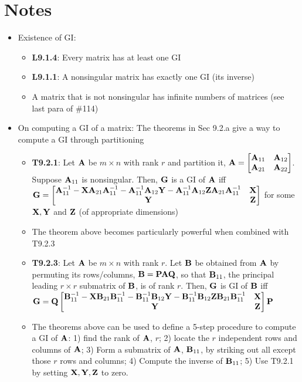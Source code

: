 \documentclass[a4paper, oneside]{book}
\begin{document}
\section*{Notes}
\begin{itemize}
\item Existence of GI:
	\begin{itemize}
	\item \textbf{L9.1.4}: Every matrix has at least one GI
	\item \textbf{L9.1.1}: A nonsingular matrix has exactly one GI (\ie its inverse)
	\item A matrix that is not nonsingular has infinite numbers of matrices (see last para of \#114)
	\end{itemize}
\item On computing a GI of a matrix: The theorems in Sec 9.2.a give a way to compute a GI through partitioning
\begin{itemize}
	\item \textbf{T9.2.1}: Let $\mathbf A$ be $m\times n$ with rank $r$ and partition it, $\mathbf A=\begin{bmatrix} \mathbf A_{11} & \mathbf A_{12} \\ \mathbf A_{21} & \mathbf A_{22} \end{bmatrix}$. Suppose $\mathbf A_{11}$ is nonsingular. Then, $\mathbf G$ is a GI of $\mathbf A$ iff 
	$\mathbf{G}=\begin{bmatrix}
	\mathbf A^{-1}_{11}-\mathbf{X}\mathbf A_{21} \mathbf A^{-1}_{11}-\mathbf A^{-1}_{11} \mathbf A_{12} \mathbf Y - \mathbf A^{-1}_{11} \mathbf A_{12} \mathbf{ZA}_{21}\mathbf A^{-1}_{11} & \mathbf X \\
	\mathbf Y & \mathbf Z
	\end{bmatrix}$ for some $\mathbf{X, Y}$ and $\mathbf Z$ (of appropriate dimensions)
	\item The theorem above becomes particularly powerful when combined with T9.2.3
	\item \textbf{T9.2.3}: Let $\mathbf A$ be $m\times n$ with rank $r$. Let $\mathbf B$ be obtained from $\mathbf A$ by permuting its rows/columns, \ie $\mathbf{B=PAQ}$, so that $\mathbf{B}_{11}$, the principal leading $r\times r$ submatrix of $\mathbf{B}$, is of rank $r$. Then, $\mathbf G$ is GI of $\mathbf B$ iff 
	$\mathbf{G}=\mathbf Q \begin{bmatrix}
	\mathbf B^{-1}_{11}-\mathbf{X}\mathbf B_{21} \mathbf B^{-1}_{11}-\mathbf B^{-1}_{11} \mathbf B_{12} \mathbf Y - \mathbf B^{-1}_{11} \mathbf B_{12} \mathbf{ZB}_{21}\mathbf B^{-1}_{11} & \mathbf X \\
	\mathbf Y & \mathbf Z
	\end{bmatrix}\mathbf P$
	\item The theorems above can be used to define a 5-step procedure to compute a GI of $\mathbf A$: 1) find the rank of $\mathbf A$, $r$; 2) locate the $r$ independent rows and columns of $\mathbf A$; 3) Form a submatrix of $\mathbf A$, $\mathbf B_{11}$, by striking out all except those $r$ rows and columns; 4) Compute the inverse of $\mathbf B_{11}$; 5) Use T9.2.1 by setting $\mathbf{X,Y,Z}$ to zero.

\end{itemize}
\end{itemize}
\end{document}
